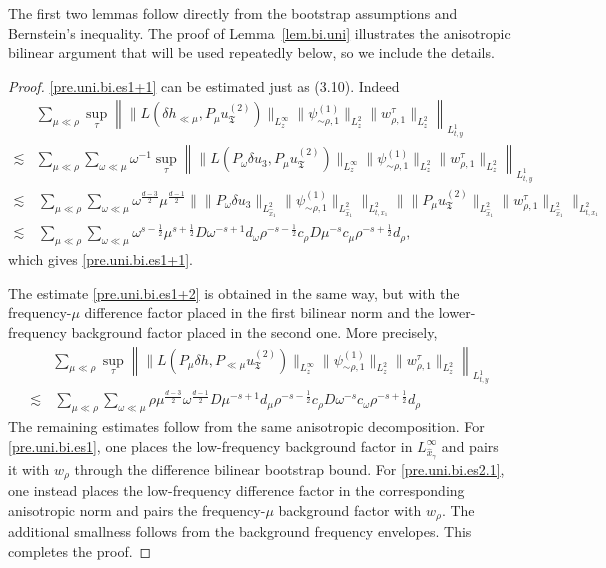 \documentclass[11pt,letterpaper,reqno]{amsart}
\numberwithin{equation}{section}
\theoremstyle{definition}
\theoremstyle{remark}
\begin{document}
The first two lemmas follow directly from the bootstrap assumptions and
Bernstein's inequality. The proof of Lemma~\ref{lem.bi.uni} illustrates the
anisotropic bilinear argument that will be used repeatedly below, so we
include the details.
\begin{proof}
\eqref{pre.uni.bi.es1+1} can be estimated just as (3.10). Indeed
    \begin{align*}
&   \sum_{\mu\ll\rho} \sup_\tau\left\|\|L(\delta h_{\ll\mu},P_\mu u_{\mathfrak T}^{(2)}) \|_{L^\infty_z}\|\psi_{\sim\rho,1}^{(1)}\|_{L^2_z}
\|w_{\rho,1}^{\tau}\|_{L^2_z}\right\|_{L^1_{t,y}}\\
\lesssim &\sum_{\mu\ll\rho} \sum_{\omega\ll\mu}  \omega^{-1} \sup_\tau\left\|\|L(P_\omega \delta u_{3  },P_\mu u_{\mathfrak T}^{(2)}) \|_{L^\infty_z}\|\psi_{\sim\rho,1}^{(1)}\|_{L^2_z}
\|w_{\rho,1}^{\tau}\|_{L^2_z}\right\|_{L^1_{t,y}}\\
\lesssim &\, \sum_{\mu\ll\rho} \sum_{\omega\ll\mu}
  \omega^{\frac {d-3} 2} \mu^{\frac {d-1 }2}     \big \| \|  P_\omega \delta u_3\|_{L^2_{\widehat{x}_1}} \| \psi_{\sim\rho,1}^{(1)}\|_{L^2_{\widehat{x}_1}} \big\|_{L^2_{ t,x_1}} \big \| \| P_{\mu}u_{\mathfrak T}^{(2)}\|_{L^2_{\widehat{x}_1}} \| w_{\rho,1}^{\tau}\|_{L^2_{\widehat{x}_1}} \big\|_{L^2_{ t,x_1}}\\
\lesssim &\, \sum_{\mu\ll\rho} \sum_{\omega\ll\mu}
  \omega^{s-\frac {1} 2} \mu^{s+\frac 12}  D \omega^{-s+1} d_{\omega} \rho^{-s-\frac 12} c_\rho     D \mu^{-s} c_{\mu} \rho^{-s+\frac 12} d_\rho,
\end{align*}
which gives \eqref{pre.uni.bi.es1+1}.

The estimate \eqref{pre.uni.bi.es1+2} is obtained in the same way, but with
the frequency-\(\mu\) difference factor placed in the first bilinear norm
and the lower-frequency background factor placed in the second one. More
precisely,
\begin{align*}
&
\sum_{\mu\ll\rho}
\sup_\tau
\left\|
\|L(P_\mu\delta h,P_{\ll\mu}u_{\mathfrak T}^{(2)})\|_{L^\infty_z}
\|\psi_{\sim\rho,1}^{(1)}\|_{L^2_z}
\|w_{\rho,1}^{\tau}\|_{L^2_z}
\right\|_{L^1_{t,y}}\\
\lesssim &\, \sum_{\mu\ll\rho} \sum_{\omega\ll\mu}
\rho\mu^{\frac {d-3} 2} \omega^{\frac {d-1 }2}  D \mu^{-s+1} d_{\mu} \rho^{-s-\frac 12} c_\rho   D   \omega^{-s} c_{\omega} \rho^{-s+\frac 12} d_\rho 
\end{align*}
The remaining estimates follow from the same anisotropic decomposition.
For \eqref{pre.uni.bi.es1}, one places the low-frequency background factor
in \(L^\infty_{\widehat{x}_\gamma}\) and pairs it with \(w_\rho\) through
the difference bilinear bootstrap bound. For
\eqref{pre.uni.bi.es2.1}, one instead places the low-frequency difference
factor in the corresponding anisotropic norm and pairs the
frequency-\(\mu\) background factor with \(w_\rho\). The additional
smallness follows from the background frequency envelopes. This completes
the proof.

\end{proof}
\end{document}
